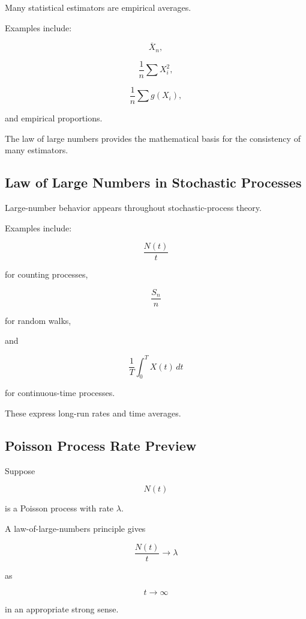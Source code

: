 Many statistical estimators are empirical averages.

Examples include:

\[
\boxed{
\overline{X}_n,
}
\]

\[
\boxed{
\frac1n\sum X_i^2,
}
\]

\[
\boxed{
\frac1n\sum g(X_i),
}
\]

and empirical proportions.

The law of large numbers provides the mathematical basis for the
consistency of many estimators.

\subsection{Law of Large Numbers in Stochastic Processes}
\label{subsec:lln-stochastic-processes}

Large-number behavior appears throughout stochastic-process theory.

Examples include:

\[
\frac{N(t)}{t}
\]

for counting processes,

\[
\frac{S_n}{n}
\]

for random walks,

and

\[
\frac1T
\int_0^T
X(t)\,dt
\]

for continuous-time processes.

These express long-run rates and time averages.

\subsection{Poisson Process Rate Preview}
\label{subsec:poisson-process-lln-preview}

Suppose

\[
N(t)
\]

is a Poisson process with rate \(\lambda\).

A law-of-large-numbers principle gives

\[
\boxed{
\frac{N(t)}{t}
\to
\lambda
}
\]

as

\[
t\to\infty
\]

in an appropriate strong sense.

